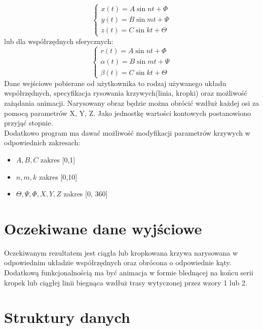\begin{equation}
	\left\{
                \begin{array}{ll}
                  x(t) = A \sin{nt + \Phi}\\
                  y(t) = B \sin{mt + \Psi}\\
                  z(t) = C \sin{kt + \Theta}
                \end{array}
              \right.
\end{equation}
lub dla współrzędnych sferycznych:
\begin{equation}
\left\{
                \begin{array}{ll}
                  r(t) = A \sin{nt + \Phi}\\
                  \alpha(t) = B \sin{mt + \Psi}\\
                  \beta(t) = C \sin{kt + \Theta}
                \end{array}
              \right.
\end{equation}
Dane wejściowe pobierane od użytkownika to rodzaj używanego układu współrzędnych, specyfikacja rysowania krzywych(linia, kropki) oraz możliwość zażądania animacji.
Narysowany obraz będzie można obrócić wzdłuż każdej osi za pomocą parametrów X, Y, Z. Jako jednostkę wartości kontowych postanowiono przyjąć stopnie.\\
Dodatkowo program ma dawać możliwość modyfikacji parametrów krzywych w odpowiednich zakresach:
\begin{itemize}
\item $A,B,C$ zakres [0,1]
\item $n, m, k$ zakres [0,10]
\item $\Theta, \Psi, \Phi, X , Y, Z$ zakres [0, 360]
\end{itemize}
 
\section{Oczekiwane dane wyjściowe}
Oczekiwanym rezultatem jest ciągła lub kropkowana krzywa narysowana w odpowiednim układzie współrzędnych oraz obrócona o odpowiednie kąty.\\
Dodatkową funkcjonalnością ma być animacja w formie blednącej na końcu serii kropek lub ciągłej linii biegnąca wzdłuż trasy wytyczonej przez wzory 1 lub 2. 
\section{Struktury danych}

